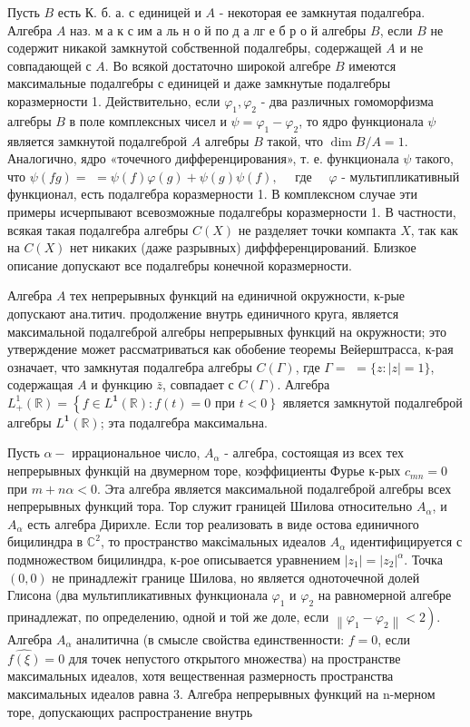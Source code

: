 \documentclass[10pt]{article}
\begin{document}
Пусть $B$ есть К. б. а. с единицей и $A$ - некоторая ее замкнутая подалгебра. Алгебра $A$ наз. м а к с им а ль н о й по д а лг е б р о й алгебры $B$, если $B$ не содержит никакой замкнутой собственной подалгебры, содержащей $A$ и не совпадающей с $A$. Во всякой достаточно широкой алгебре $B$ имеются максимальные подалгебры с единицей и даже замкнутые подалгебры коразмерности 1. Действительно, если $\varphi_{1}, \varphi_{2}$ - два различных гомоморфизма алгебры $B$ в поле комплексных чисел и $\psi=\varphi_{1}-\varphi_{2}$, то ядро функционала $\psi$ является замкнутой подалгеброй $A$ алгебры $B$ такой, что $\operatorname{dim} B / A=1$. Аналогично, ядро «точечного дифференцирования», т. е. функционала $\psi$ такого, что $\psi(f g)=$ $=\psi(f) \varphi(g)+\psi(g) \psi(f), \quad$ где $\quad \varphi$ - мультипликативный функционал, есть подалгебра коразмерности 1. В комплексном случае эти примеры исчерпывают всевозможные подалгебры коразмерности 1. В частности, всякая такая подалгебра алгебры $C(X)$ не разделяет точки компакта $X$, так как на $C(X)$ нет никаких (даже разрывных) диффференцирований. Близкое описание допускают все подалгебры конечной коразмерности.



Алгебра $A$ тех непрерывных функций на единичной окружности, к-рые допускают ана.титич. продолжение внутрь единичного круга, является максимальной подалгеброй алгебры непрерывных функций на окружности; это утверждение может рассматриваться как обобение теоремы Вейерштрасса, к-рая означает, что замкнутая подалгебра алгебры $C(\Gamma)$, где $\Gamma=$ $=\{z:|z|=1\}$, содержащая $A$ и функцию $\bar{z}$, совпадает с $C(\Gamma)$. Алгебра $L_{+}^{1}(\mathbb{R})=\left\{f \in L^{\mathbf{1}}(\mathbb{R}): f(t)=0\right.$ при $\left.t<0\right\}$ является замкнутой подалгеброй алгебры $L^{\mathbf{1}}(\mathbb{R})$; эта подалгебра максимальна.



Пусть $\alpha-$ иррациональное число, $A_{\alpha}$ - алгебра, состоящая из всех тех непрерывных функцій на двумерном торе, коэффициенты Фурье к-рых $c_{m n}=0$ при $m+n \alpha<0$. Эта алгебра является максимальной подалгеброй алгебры всех непрерывных функций тора. Тор служит границей Шилова относительно $A_{\alpha}$, и $A_{\alpha}$ есть алгебра Дирихле. Если тор реализовать в виде остова единичного бицилиндра в $\mathbb{C}^{2}$, то пространство максімальных идеалов $A_{\alpha}$ идентифицируется с подмножеством бицилиндра, к-рое описывается уравнением $\left|z_{1}\right|=\left|z_{2}\right|^{\alpha}$. Точка $(0,0)$ не принадлежіт границе Шилова, но является одноточечной долей Глисона (два мультипликативных функционала $\varphi_{1}$ и $\varphi_{2}$ на равномерной алгебре принадлежат, по определению, одной и той же доле, если $\left.\left\|\varphi_{1}-\varphi_{2}\right\|<2\right)$. Алгебра $A_{\alpha}$ аналитична (в смысле свойства единственности: $f=0$, если $\hat{f(\xi)}=0$ для точек непустого открытого множества) на пространстве максимальных идеалов, хотя вещественная размерность пространства максимальных идеалов равна 3. Алгебра непрерывных функций на n-мерном торе, допускающих распространение внутрь
\end{document}

